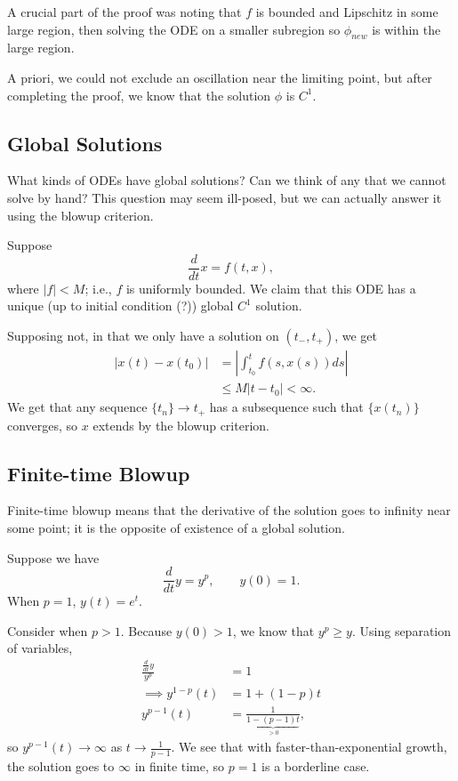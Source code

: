 \documentclass{tufte-handout}
\theoremstyle{definition}
\begin{document}
A crucial part of the proof was noting that $f$ is bounded and Lipschitz in some large region, then solving the ODE on a smaller subregion so $\phi_{new}$ is within the large region.

A priori, we could not exclude an oscillation near the limiting point, but after completing the proof, we know that the solution $\phi$ is $C^1$.

\subsection{Global Solutions}
What kinds of ODEs have global solutions? Can we think of any that we cannot solve by hand? This question may seem ill-posed, but we can actually answer it using the blowup criterion.

Suppose \[
	\frac{d}{dt}x = f(t,x)
,\] where $\left| f \right| < M$; i.e., $f$ is uniformly bounded. We claim that this ODE has a unique (up to initial condition (?)) global $C^1$ solution.

Supposing not, in that we only have a solution on $(t_-, t_+)$, we get
\begin{align*}
	\left| x(t) - x(t_0) \right| &= \left| \int_{t_0}^{t} f(s, x(s))ds  \right| \\
								 &\le M \left| t-t_0 \right| < \infty
.\end{align*} We get that any sequence $\{t_n\} \to t_+$ has a subsequence such that $\{x(t_n)\}$ converges, so $x$ extends by the blowup criterion.

\subsection{Finite-time Blowup}
Finite-time blowup means that the derivative of the solution goes to infinity near some point; it is the opposite of existence of a global solution.

Suppose we have \[
	\frac{d}{dt} y = y^p, \qquad y(0) = 1
.\] When $p= 1$, $y(t) = e^t$.

Consider when $p>1$. Because $y(0) > 1$, we know that $y^p \ge y$. Using separation of variables,
\begin{align*}
	\frac{\frac{d}{dt}y}{y^p} &=  1 \\
	\implies y^{1-p}(t) &= 1 + (1-p)t \\
	y^{p-1}(t) &= \frac{1}{\underbrace{1-(p-1)t}_{>0}}
,\end{align*}
so $y^{p-1}(t) \to \infty$ as $t \to \frac{1}{p-1}$.
We see that with faster-than-exponential growth, the solution goes to $\infty$ in finite time, so $p=1$ is a borderline case.
\end{document}
